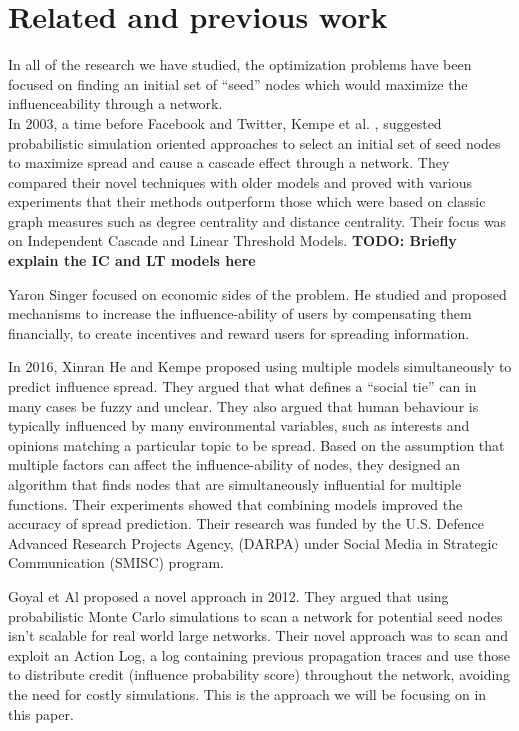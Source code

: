 \documentclass{acm_proc_article-sp}
\begin{document}
\section{Related and previous work}

In all of the research we have studied, the optimization problems have been focused on finding an initial set of “seed” nodes which would maximize the influenceability through a network. \\

In 2003, a time before Facebook and Twitter, Kempe et al. \cite{kempe:maxspread}, suggested probabilistic simulation oriented approaches to select an initial set of seed nodes to maximize spread and cause a cascade effect through a network. They compared their novel techniques with older models and proved with various experiments that their methods outperform those which were based on classic graph measures such as degree centrality and distance centrality. Their focus was on Independent Cascade and Linear Threshold Models.
\textbf{TODO: Briefly explain the IC and LT models here}

Yaron Singer \cite{singer:winfriends} focused on economic sides of the problem. He studied and proposed mechanisms to increase the influence-ability of users by compensating them financially, to create incentives and reward users for spreading information.

In 2016, Xinran He and Kempe \cite{DBLP:journals/corr/HeK16} proposed using multiple models simultaneously to predict influence spread. They argued that what defines a “social tie” can in many cases be fuzzy and unclear. They also argued that human behaviour is typically influenced by many environmental variables, such as interests and opinions matching a particular topic to be spread. Based on the assumption that multiple factors can affect the influence-ability of nodes, they designed an algorithm that finds nodes that are simultaneously influential for multiple functions. Their experiments showed that combining models improved the accuracy of spread prediction. Their research was funded by the U.S. Defence Advanced Research Projects Agency, (DARPA) under Social Media in Strategic Communication (SMISC) program.


Goyal et Al \cite{goyal:datainfluence} proposed a novel approach in 2012. They argued that using probabilistic Monte Carlo simulations to scan a network for potential seed nodes isn't scalable for real world large networks. Their novel approach was to scan and exploit an Action Log, a log containing previous propagation traces and use those to distribute credit (influence probability score) throughout the network, avoiding the need for costly simulations. This is the approach we will be focusing on in this paper.
\end{document}
